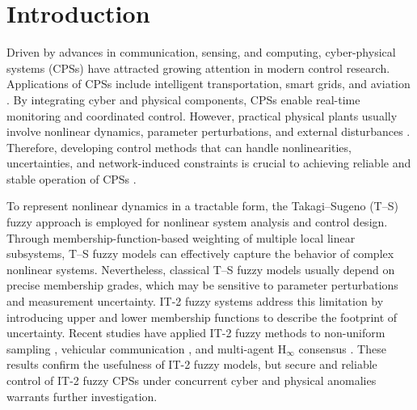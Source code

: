 \documentclass[preprint,review,fleqn,sort&compress,3p]{elsarticle}
\theoremstyle{definition} %
\theoremstyle{definition}%
\begin{document}
\section{Introduction}%
Driven by advances in communication, sensing, and computing, cyber-physical systems (CPSs) have attracted growing attention in modern control research. Applications of CPSs include intelligent transportation, smart grids, and aviation
\cite{wangMixedVehicleGroup2024,liuFalseDataInjectionAttack2023,dingSurveyModelBasedDistributed2019}.
By integrating cyber and physical components, CPSs enable real-time monitoring and coordinated control. However, practical physical plants usually involve nonlinear dynamics, parameter perturbations, and external disturbances
\cite{chenRobustAdaptiveControl2024,yuanAdaptiveControlNonlinear2024}.
Therefore, developing control methods that can handle nonlinearities, uncertainties, and network-induced constraints is crucial to achieving reliable and stable operation of CPSs
\cite{biAdaptiveDecentralizedFiniteTime2023}.

To represent nonlinear dynamics in a tractable form, the Takagi--Sugeno (T--S)
fuzzy approach \cite{wangStabilityStabilizationTS2021,wangSwitchingAsynchronousControl2024}
is employed for nonlinear system analysis and control design. Through membership-function-based weighting of multiple local linear subsystems, T--S fuzzy models can effectively capture the behavior of complex nonlinear systems. Nevertheless, classical
T--S fuzzy models usually depend on precise membership grades, which may be
sensitive to parameter perturbations and measurement uncertainty. IT-2 fuzzy systems \cite{shengAperiodicSamplingDependentEventTriggeredControl2024,liFiniteTimeDynamicEventTriggered2022}
address this limitation by introducing upper and lower membership functions to
describe the footprint of uncertainty. Recent studies have applied IT-2 fuzzy
methods to non-uniform sampling \cite{liuObserverBasedAdaptiveEventTriggered2024},
vehicular communication \cite{zhangNovelApproachVehicular2025}, and multi-agent
$\mathrm{H}_\infty$ consensus \cite{duIntervalType2Fuzzy2025}. These results confirm
the usefulness of IT-2 fuzzy models, but secure and reliable control of IT-2 fuzzy
CPSs under concurrent cyber and physical anomalies warrants further investigation.
\end{document}
